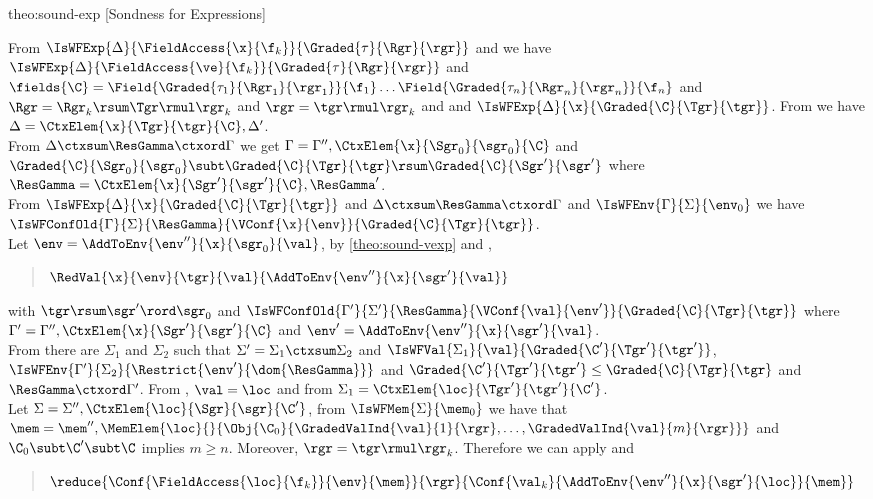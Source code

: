 \begin{proofOf}{theo:sound-exp} [Sondness for Expressions]
\begin{description}
\bigskip
\bpa
From $\IsWFExp{\Delta}{\FieldAccess{\x}{\f_k}}{\Graded{\tau}{\Rgr}{\rgr}}$ and  
we have $\IsWFExp{\Delta}{\FieldAccess{\ve}{\f_k}}{\Graded{\tau}{\Rgr}{\rgr}}$ and $\fields{\C}=\Field{\Graded{\tau_1}{\Rgr_1}{\rgr_1}}{\f_1} \ldots \Field{\Graded{\tau_n}{\Rgr_n}{\rgr_n}}{\f_n}$ and
$\Rgr=\Rgr_k\rsum\Tgr\rmul\rgr_k$ and $\rgr=\tgr\rmul\rgr_k$ and
and
$\IsWFExp{\Delta}{\x}{\Graded{\C}{\Tgr}{\tgr}}$. From
  we have $\Delta=\CtxElem{\x}{\Tgr}{\tgr}{\C},\Delta'$.
\\
%
From  
$\Delta\ctxsum\ResGamma\ctxord\Gamma$ we get $\Gamma=\Gamma'',\CtxElem{\x}{\Sgr_0}{\sgr_0}{\C}$ and 
$\Graded{\C}{\Sgr_0}{\sgr_0}\subt\Graded{\C}{\Tgr}{\tgr}\rsum\Graded{\C}{\Sgr'}{\sgr'}$ where $\ResGamma=\CtxElem{\x}{\Sgr'}{\sgr'}{\C},\ResGamma'$.
\\
From 
$\IsWFExp{\Delta}{\x}{\Graded{\C}{\Tgr}{\tgr}}$ and $\Delta\ctxsum\ResGamma\ctxord\Gamma$ and $\IsWFEnv{\Gamma}{\Sigma}{\env_0}$ we have
$\IsWFConfOld{\Gamma}{\Sigma}{\ResGamma}{\VConf{\x}{\env}}{\Graded{\C}{\Tgr}{\tgr}}$. 
\\
Let $\env=\AddToEnv{\env''}{\x}{\sgr_0}{\val}$,  by  \cref{theo:sound-vexp} and ,
 \begin{quote}
$\RedVal{\x}{\env}{\tgr}{\val}{\AddToEnv{\env''}{\x}{\sgr'}{\val}}$
\end{quote}
with $\tgr\rsum\sgr'\rord\sgr_0$ and 
$\IsWFConfOld{\Gamma'}{\Sigma'}{\ResGamma}{\VConf{\val}{\env'}}{\Graded{\C}{\Tgr}{\tgr}}$ where $\Gamma'=\Gamma'',\CtxElem{\x}{\Sgr'}{\sgr'}{\C}$
and $\env'=\AddToEnv{\env''}{\x}{\sgr'}{\val}$. \\
From   there are $\Sigma_1$ and $\Sigma_2$ such that $\Sigma'=\Sigma_1\ctxsum\Sigma_2$ and $\IsWFVal{\Sigma_1}{\val}{\Graded{\C'}{\Tgr'}{\tgr'}}$, $\IsWFEnv{\Gamma'}{\Sigma_2}{\Restrict{\env'}{\dom{\ResGamma}}}$ and $\Graded{\C'}{\Tgr'}{\tgr'}\leq\Graded{\C}{\Tgr}{\tgr}$
and $\ResGamma\ctxord\Gamma'$. From , $\val=\loc$ and from  $\Sigma_1=\CtxElem{\loc}{\Tgr'}{\tgr'}{\C'}$.\\
%
Let
 $\Sigma=\Sigma'', \CtxElem{\loc}{\Sgr}{\sgr}{\C'}$,
from  $\IsWFMem{\Sigma}{\mem_0}$  we have that  
$\mem=\mem'',\MemElem{\loc}{}{\Obj{{\C_0}}{\GradedValInd{\val}{1}{\rgr},\ldots,\GradedValInd{\val}{m}{\rgr}}}$ and $\C_0\subt\C'\subt\C$ implies  $m\geq n$.
Moreover, 
$\rgr=\tgr\rmul\rgr_k$.
Therefore we can apply  and
\begin{quote}
$ \reduce{\Conf{\FieldAccess{\loc}{\f_k}}{\env}{\mem}}{\rgr}{\Conf{\val_k}{\AddToEnv{\env''}{\x}{\sgr'}{\loc}}{\mem}}$ 
\end{quote}


\end{description}
\end{proofOf}

